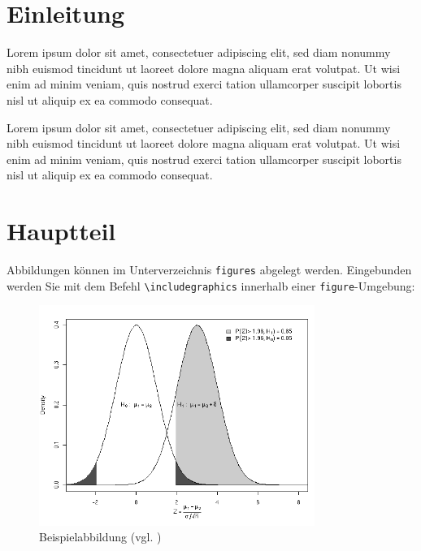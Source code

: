 




\tableofcontents

\clearpage
\section{Einleitung}
\label{sec:Einleitung}
Lorem ipsum dolor sit amet, consectetuer adipiscing elit, sed diam nonummy nibh euismod tincidunt ut laoreet dolore magna aliquam erat volutpat. Ut wisi enim ad minim veniam, quis nostrud exerci tation ullamcorper suscipit lobortis nisl ut aliquip ex ea commodo consequat. \cite{Konak2006,Sailer2013}

Lorem ipsum dolor sit amet, consectetuer adipiscing elit, sed diam nonummy nibh euismod tincidunt ut laoreet dolore magna aliquam erat volutpat. Ut wisi enim ad minim veniam, quis nostrud exerci tation ullamcorper suscipit lobortis nisl ut aliquip ex ea commodo consequat. \cite{01_MW-Paper}

\section{Hauptteil}
\label{sec:Hauptteil}

Abbildungen können im Unterverzeichnis \texttt{figures} abgelegt werden.
Eingebunden werden Sie mit dem Befehl \texttt{\textbackslash includegraphics} innerhalb
einer \texttt{figure}-Umgebung:
\begin{figure}[htb]
  \centering
  \includegraphics[width=0.8\textwidth]{figures/power.png}
  \caption{Beispielabbildung (vgl. \cite{technet})}
  \label{fig:power}
\end{figure}

